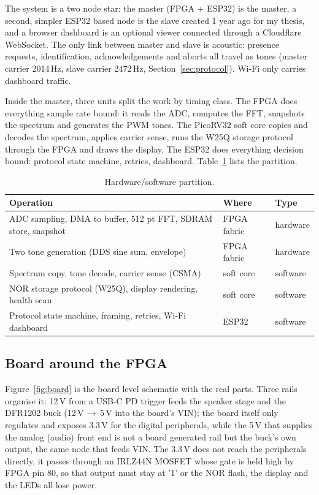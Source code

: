 \documentclass[a4paper,10pt]{article}
\begin{document}
The system is a two node star: the master (FPGA + ESP32) is the master, a second,
simpler ESP32 based node is the slave created 1 year ago for my thesis, and a browser dashboard is an optional viewer
connected through a Cloudflare WebSocket. The only link between master
and slave is acoustic: presence requests, identification, acknowledgements and aborts
all travel as tones (master carrier 2014\,Hz, slave carrier 2472\,Hz,
Section~\ref{sec:protocol}). Wi-Fi only carries dashboard traffic.

Inside the master, three units split the work by timing class. The FPGA
does everything sample rate bound: it reads the ADC, computes the FFT, snapshots the
spectrum and generates the PWM tones. The PicoRV32 soft core copies and decodes the spectrum, applies carrier sense,
runs the W25Q storage protocol through the FPGA and draws the display. The ESP32 does everything decision
bound: protocol state machine, retries, dashboard. Table~\ref{tab:partition} lists the
partition.

\begin{table}[H]
\centering
\caption{Hardware/software partition.}
\label{tab:partition}
\small
\begin{tabular}{lll}
\toprule
\textbf{Operation} & \textbf{Where} & \textbf{Type} \\
\midrule
ADC sampling, DMA to buffer, 512 pt FFT, SDRAM store, snapshot & FPGA fabric & hardware \\
Two tone generation (DDS sine sum, envelope) & FPGA fabric & hardware \\
Spectrum copy, tone decode, carrier sense (CSMA) & soft core & software \\
NOR storage protocol (W25Q), display rendering, health scan & soft core & software \\
Protocol state machine, framing, retries, Wi-Fi dashboard & ESP32 & software \\
\bottomrule
\end{tabular}
\end{table}

\subsection{Board around the FPGA}
\label{sec:board}

Figure~\ref{fig:board} is the board level schematic with the real parts. Three rails
organise it: 12\,V from a USB-C PD trigger feeds the speaker stage and the DFR1202
buck (12\,V\,$\to$\,5\,V into the board's VIN); the board itself only
regulates and exposes 3.3\,V for the digital peripherals, while the 5\,V that supplies
the analog (audio) front end is not a board generated rail but the buck's own output, the same node that feeds VIN. The 3.3\,V does not reach the peripherals directly, it passes through
an IRLZ44N MOSFET whose gate is held high by FPGA pin 80, so that output must stay at
'1' or the NOR flash, the display and the LEDs all lose power.
\end{document}
